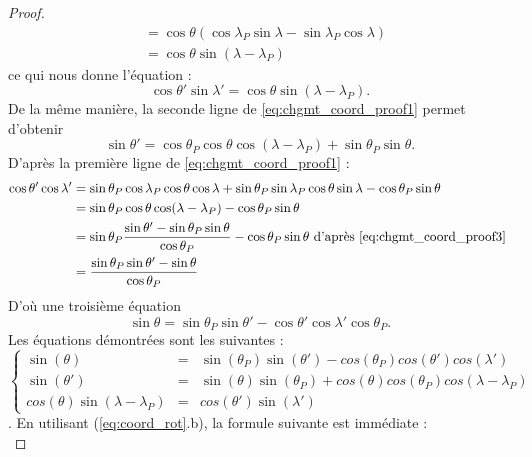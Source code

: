 \begin{proof}
\begin{align*}
	& = \cos \theta ( \cos \lambda_P \sin \lambda - \sin \lambda_P \cos \lambda) \\
	& = \cos \theta \sin (\lambda - \lambda_P)
\end{align*}
ce qui nous donne l'équation :
\begin{equation}
\cos \theta' \sin \lambda' = \cos \theta \sin (\lambda - \lambda_P).
\label{eq:chgmt_coord_proof2}
\end{equation}
De la même manière, la seconde ligne de \eqref{eq:chgmt_coord_proof1} permet d'obtenir
\begin{equation}
\sin \theta' = \cos \theta_P \cos \theta \cos (\lambda - \lambda_P) + \sin \theta_P \sin \theta .
\label{eq:chgmt_coord_proof3}
\end{equation}
D'après la première ligne de \eqref{eq:chgmt_coord_proof1} :
\begin{align*}
\cos \theta' \cos \lambda' & = \sin \theta_P \cos \lambda_P \cos \theta \cos \lambda + \sin \theta_P \sin \lambda_P \cos \theta \sin \lambda - \cos \theta_P \sin \theta \\
	& = \sin \theta_P \cos \theta \cos ( \lambda - \lambda_P) - \cos \theta_P \sin \theta \\
	& = \sin \theta_P \dfrac{\sin \theta' - \sin \theta_P \sin \theta}{\cos \theta_P} - \cos \theta_P \sin \theta \text{ d'après \eqref{eq:chgmt_coord_proof3} } \\
	& = \dfrac{\sin \theta_P \sin \theta' - \sin \theta}{\cos \theta_P}
\end{align*}
D'où une troisième équation
\begin{equation}
\sin \theta = \sin \theta_P \sin \theta' - \cos \theta' \cos \lambda' \cos \theta_P .
\label{eq:chgmt_coord_proof4}
\end{equation}
Les équations démontrées sont les suivantes :
\begin{equation}
\label{eq:coord_rot}
\left\lbrace 
\begin{array}{rcl}
\sin ( \theta ) & = & \sin( \theta_P) \sin( \theta') - cos( \theta_P) cos( \theta') cos( \lambda' ) \\
\sin( \theta' ) & = & \sin( \theta) \sin(\theta_P) + cos( \theta ) cos( \theta_P) cos( \lambda - \lambda_P ) \\
cos( \theta ) \sin( \lambda - \lambda_P) & = & cos( \theta' ) \sin( \lambda' )
\end{array}
\right.
\end{equation}.
En utilisant (\ref{eq:coord_rot}.b), la formule suivante est immédiate :
\begin{equation}

\end{equation}
\end{proof}
